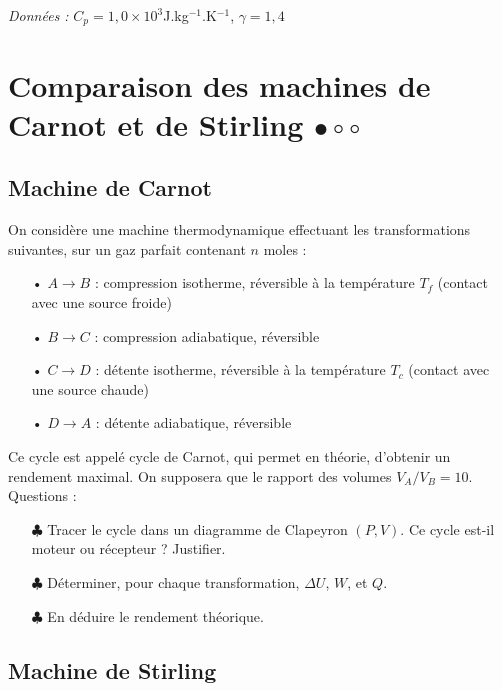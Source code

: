 \documentclass{report}
\begin{document}
\textit{Données :} $C_p=1,0\times10^3$J.kg$^{-1}$.K$^{-1}$, $\gamma=1,4$

\newpage

\section*{Comparaison des machines de Carnot et de Stirling $\bullet\circ\circ$}

\subsection*{Machine de Carnot}

On considère une machine thermodynamique effectuant les transformations suivantes, sur un gaz parfait contenant $n$ moles : 

\begin{itemize}
\item[•]$A \rightarrow B$ : compression isotherme, réversible à la température $T_f$ (contact avec une source froide)
\item[•]$B \rightarrow C$ : compression adiabatique, réversible
\item[•]$C \rightarrow D$ : détente isotherme, réversible à la température $T_c$ (contact avec une source chaude)
\item[•]$D \rightarrow A$ : détente adiabatique, réversible

\end{itemize}

Ce cycle est appelé cycle de Carnot, qui permet en théorie, d'obtenir un rendement maximal. On supposera que le rapport des volumes $V_A/V_B=10$. Questions : 

\begin{itemize}

	\item[$\clubsuit$] Tracer le cycle dans un diagramme de Clapeyron $(P,V)$. Ce cycle est-il moteur ou récepteur ? Justifier. 

	\item[$\clubsuit$] Déterminer, pour chaque transformation, $\Delta U$, $W$, et $Q$. 
	
	\item[$\clubsuit$] En déduire le rendement théorique.
	
\end{itemize}

\subsection*{Machine de Stirling}
\end{document}
